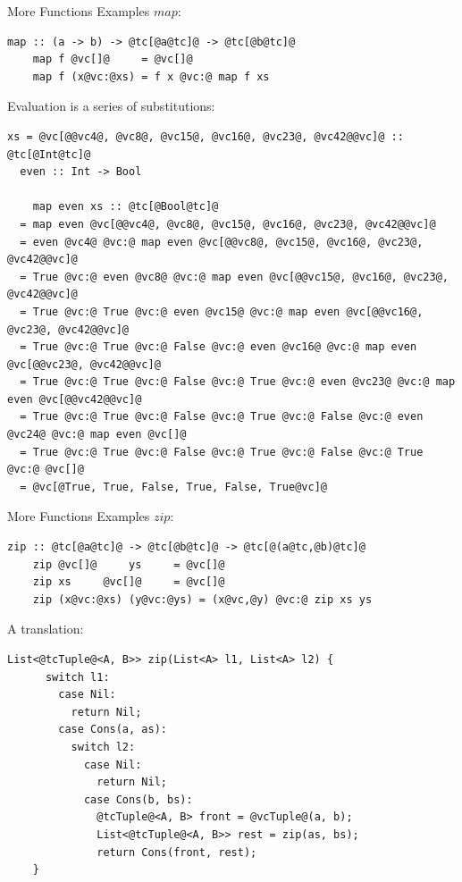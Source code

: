 \documentclass[xcolor={usenames,dvipsnames}]{beamer}
\begin{document}
\begin{frame}[fragile]{More Functions Examples}
  $map$:
  \begin{lstlisting}[style=hask]
    map :: (a -> b) -> @tc[@a@tc]@ -> @tc[@b@tc]@
    map f @vc[]@     = @vc[]@
    map f (x@vc:@xs) = f x @vc:@ map f xs
  \end{lstlisting}

  Evaluation is a series of substitutions:
  \begin{lstlisting}[style=hask]
  xs = @vc[@@vc4@, @vc8@, @vc15@, @vc16@, @vc23@, @vc42@@vc]@ :: @tc[@Int@tc]@
  even :: Int -> Bool

    map even xs :: @tc[@Bool@tc]@
  = map even @vc[@@vc4@, @vc8@, @vc15@, @vc16@, @vc23@, @vc42@@vc]@
  = even @vc4@ @vc:@ map even @vc[@@vc8@, @vc15@, @vc16@, @vc23@, @vc42@@vc]@
  = True @vc:@ even @vc8@ @vc:@ map even @vc[@@vc15@, @vc16@, @vc23@, @vc42@@vc]@
  = True @vc:@ True @vc:@ even @vc15@ @vc:@ map even @vc[@@vc16@, @vc23@, @vc42@@vc]@
  = True @vc:@ True @vc:@ False @vc:@ even @vc16@ @vc:@ map even @vc[@@vc23@, @vc42@@vc]@
  = True @vc:@ True @vc:@ False @vc:@ True @vc:@ even @vc23@ @vc:@ map even @vc[@@vc42@@vc]@
  = True @vc:@ True @vc:@ False @vc:@ True @vc:@ False @vc:@ even @vc24@ @vc:@ map even @vc[]@
  = True @vc:@ True @vc:@ False @vc:@ True @vc:@ False @vc:@ True @vc:@ @vc[]@
  = @vc[@True, True, False, True, False, True@vc]@

  \end{lstlisting}
\end{frame}

\begin{frame}[fragile]{More Functions Examples}
  $zip$:
  \begin{lstlisting}[style=hask]
    zip :: @tc[@a@tc]@ -> @tc[@b@tc]@ -> @tc[@(a@tc,@b)@tc]@
    zip @vc[]@     ys     = @vc[]@
    zip xs     @vc[]@     = @vc[]@
    zip (x@vc:@xs) (y@vc:@ys) = (x@vc,@y) @vc:@ zip xs ys
  \end{lstlisting}

  \pause
  A translation:
  \begin{lstlisting}[style=hask]
    List<@tcTuple@<A, B>> zip(List<A> l1, List<A> l2) {
      switch l1:
        case Nil:
          return Nil;
        case Cons(a, as):
          switch l2:
            case Nil:
              return Nil;
            case Cons(b, bs):
              @tcTuple@<A, B> front = @vcTuple@(a, b);
              List<@tcTuple@<A, B>> rest = zip(as, bs);
              return Cons(front, rest);
    }
  \end{lstlisting}
\end{frame}
\end{document}
